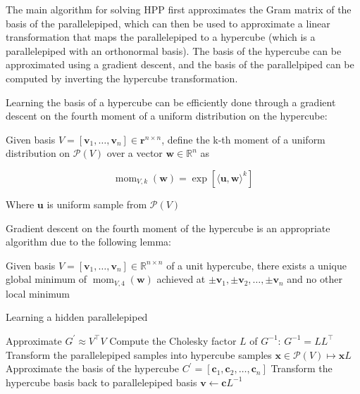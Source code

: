 The main algorithm for solving HPP first approximates the Gram matrix of the basis of the parallelepiped, which can then be used to approximate a linear transformation that maps the parallelepiped to a hypercube (which is a parallelepiped with an orthonormal basis). The basis of the hypercube can be approximated using a gradient descent, and the basis of the parallelpiped can be computed by inverting the hypercube transformation.

Learning the basis of a hypercube can be efficiently done through a gradient descent on the fourth moment of a uniform distribution on the hypercube:

\begin{definition}
    Given basis $V = [\mathbf{v}_1, \ldots, \mathbf{v}_n] \in \mathbf{r}^{n \times n}$, define the k-th moment of a uniform distribution on $\mathcal{P}(V)$ over a vector $\mathbf{w} \in \mathbb{R}^n$ as

    $$
    \operatorname{mom}_{V, k}(\mathbf{w}) = \exp[
        \langle \mathbf{u}, \mathbf{w} \rangle^k
    ]
    $$

    Where $\mathbf{u}$ is uniform sample from $\mathcal{P}(V)$
\end{definition}

Gradient descent on the fourth moment of the hypercube is an appropriate algorithm due to the following lemma:

\begin{lemma}
    Given basis $V = [\mathbf{v}_1, \ldots, \mathbf{v}_n] \in \mathbb{R}^{n \times n}$ of a unit hypercube, there exists a unique global minimum of $\operatorname{mom}_{V, 4}(\mathbf{w})$ achieved at $\pm\mathbf{v}_1, \pm\mathbf{v}_2, \ldots, \pm\mathbf{v}_n$ and no other local minimum
\end{lemma}

\begin{algorithm}
\caption{Learning a hidden parallelepiped}
\begin{algorithmic}[1]
    \State Approximate $G^\prime \approx V^\intercal V$
    \State Compute the Cholesky factor $L$ of $G^{-1}$: $G^{-1} = LL^\intercal$
    \State Transform the parallelepiped samples into hypercube samples $\mathbf{x} \in \mathcal{P}(V) \mapsto \mathbf{x}L$
    \State Approximate the basis of the hypercube $C^\prime = [\mathbf{c}_1, \mathbf{c}_2, \ldots, \mathbf{c}_n]$
    \State Transform the hypercube basis back to parallelepiped basis $\mathbf{v} \leftarrow \mathbf{c}L^{-1}$
\end{algorithmic}
\end{algorithm}


